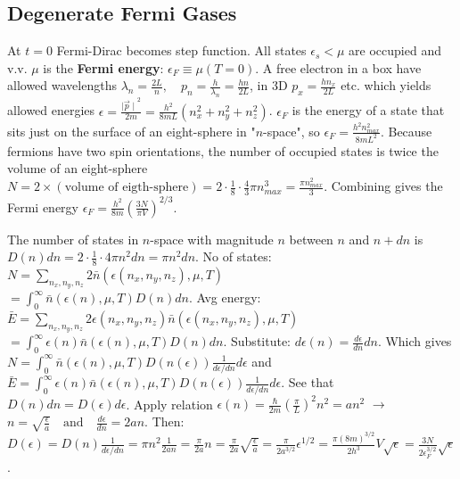 \documentclass[11pt,twocolumn]{amsart}
\begin{document}
\subsection{Degenerate Fermi Gases}
At $t=0$ Fermi-Dirac becomes step function. All states $\epsilon_s < \mu$ are occupied and v.v. $\mu$ is the \textbf{Fermi energy}: $ \epsilon_{F} \equiv \mu(T=0)$. A free electron in a box have allowed wavelengths $ \lambda_n = \frac{2L}{n}, \quad p_n = \frac{h}{\lambda_n} = \frac{hn}{2L} $, in 3D $ p_x = \frac{hn_x}{2L}$ etc. which yields allowed energies $ \epsilon = \frac{\mid {\vec{p} \mid }^2}{2m} = \frac{h^2}{8mL}(n_x^2 + n_y^2 + n_z^2) $. $\epsilon_F$ is the energy of a state that sits just on the surface of an eight-sphere in "$n$-space", so $ \epsilon_F = \frac{h^2n^2_{max}}{8mL^2} $. Because fermions have two spin orientations, the number of occupied states is twice the volume of an eight-sphere $ N = 2 \times (\text{volume of eigth-sphere}) = 2 \cdot \frac{1}{8} \cdot \frac{4}{3} \pi n^3_{max} = \frac{\pi n^2_{max}}{3} $. Combining gives the Fermi energy $ \epsilon_F = \frac{h^2}{8m} \left( \frac{3N}{\pi V} \right)^{2/3} $.

The number of states in $n$-space with magnitude $n$ between $n$ and $n+dn$ is $ D(n)dn = 2 \cdot \frac{1}{8} \cdot 4 \pi n^2 dn = \pi n^2 dn $. No of states: $ N = \sum_{n_x,n_y,n_z} 2\bar{n}(\epsilon(n_x,n_y,n_z), \mu, T)$\\$= \int_0^{\infty} \bar{n}(\epsilon(n), \mu, T)D(n)dn $. Avg energy:\\ $ \bar{E} = \sum_{n_x,n_y,n_z} 2\epsilon(n_x,n_y,n_z)\bar{n}(\epsilon(n_x,n_y,n_z), \mu, T)$\\$= \int_0^{\infty}\epsilon(n)\bar{n}(\epsilon(n), \mu, T)D(n)dn $. Substitute: $ d\epsilon(n) = \frac{d\epsilon}{dn}dn $. Which gives $ N = \int_0^{\infty} \bar{n}(\epsilon(n), \mu, T)D(n(\epsilon))\frac{1}{d\epsilon / dn} d\epsilon $ and \\$ \bar{E} = \int_0^{\infty}\epsilon(n)\bar{n}(\epsilon(n), \mu, T)D(n(\epsilon))\frac{1}{d\epsilon / dn} d\epsilon$. See that $ D(n)dn = D(\epsilon)d\epsilon $. Apply relation $ \epsilon(n) = \frac{\hbar}{2m}\left( \frac{\pi}{L} \right)^2 n^2 = an^2 $ $\rightarrow$ $ n = \sqrt{\frac{\epsilon}{a}} \quad \text{and} \quad \frac{d\epsilon}{dn} = 2an $. Then: $ D(\epsilon) = D(n)\frac{1}{d\epsilon / dn} = \pi n^2 \frac{1}{2an} = \frac{\pi}{2a}n = \frac{\pi}{2a} \sqrt{\frac{\epsilon}{a}}
        = \frac{\pi}{2a^{3/2}}\epsilon^{1/2} = \frac{\pi(8m)^{3/2}}{2h^3}V\sqrt{\epsilon} = \frac{3N}{2\epsilon_F^{3/2}}\sqrt{\epsilon} $.
\end{document}
